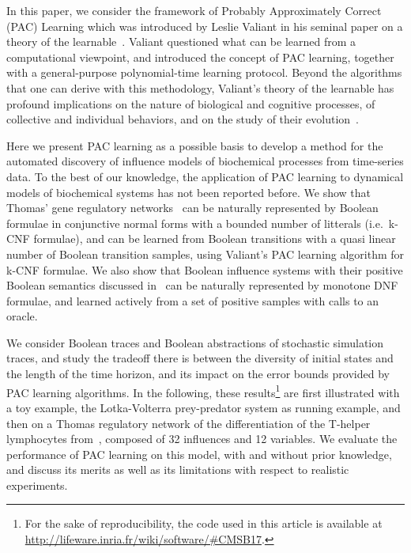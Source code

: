 \documentclass{llncs}
\begin{document}
In this paper, we consider the framework of Probably Approximately Correct (PAC) Learning 
which was introduced by Leslie Valiant in his seminal paper on a theory of the learnable~\cite{Valiant84cacm}.
Valiant questioned what can be learned from a computational viewpoint,
and introduced the concept of PAC learning,
together with a general-purpose polynomial-time learning protocol.
Beyond the algorithms that one can derive with this methodology,
Valiant's theory of the learnable has profound implications
on the nature of biological and cognitive processes,
of collective and individual behaviors,
and on the study of their evolution~\cite{Valiant13book}.

Here we present PAC learning as a possible basis to develop a method for the automated discovery of influence models of biochemical processes from time-series data. 
To the best of our knowledge, 
the application of PAC learning to dynamical models of biochemical systems has not been reported before.
We show that Thomas' gene regulatory networks~\cite{Thomas91jtb,Thomas73jtb} can be naturally represented by 
Boolean formulae in conjunctive normal forms with a bounded number of litterals (i.e.~k-CNF formulae),
and can be learned from Boolean transitions with a quasi linear number of Boolean transition samples, using Valiant's PAC learning algorithm for k-CNF formulae.
We also show that Boolean influence systems with their positive Boolean semantics discussed in~\cite{FMRS16cmsb}
can be naturally represented by monotone DNF formulae,
and learned actively from a set of positive samples with calls to an oracle.

We consider Boolean traces and Boolean abstractions of stochastic simulation traces,
and study the tradeoff there is between the diversity of initial states and the length of the time horizon, 
and its impact on the error bounds provided by PAC learning algorithms.
In the following, these results\footnote{For the sake of reproducibility, the code used in this article is available at \url{http://lifeware.inria.fr/wiki/software/\#CMSB17}.} are first illustrated with a toy example, the Lotka-Volterra prey-predator system as running example,
and then on a Thomas regulatory network of 
the differentiation of the T-helper lymphocytes from~\cite{RRMTC06tcsb,Mendoza06biosystems},
composed of 32 influences and 12 variables.
We evaluate the performance of PAC learning on this model, with and without prior knowledge,
and discuss its merits as well as its limitations with respect to realistic experiments.
\end{document}
